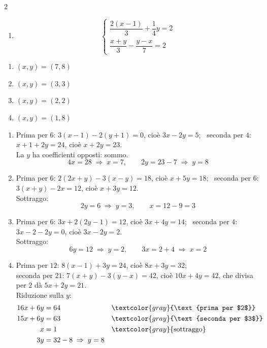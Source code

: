 \begin{question}[ID=2.5, subtitle={Sistemi con frazioni complesse}, difficulty=difficile, tags={sistemi, equazioni lineari, frazioni}]
\begin{multicols}{2}
\begin{enumerate}[leftmargin=3.2cm]
    \item
    \[
    \begin{cases}
    \dfrac{2(x-1)}{3}+\dfrac{1}{4}y=2\\
    \dfrac{x+y}{3}-\dfrac{y-x}{7}=2
    \end{cases}
    \]
\end{enumerate}
\end{multicols}
\begin{solution}
\begin{enumerate}
    \item $(x,y)=(7,8)$
    \item $(x,y)=(3,3)$
    \item $(x,y)=(2,2)$
    \item $(x,y)=(1,8)$
\end{enumerate}
\end{solution}
\begin{explanation}
\begin{enumerate}
    \item Prima per $6$: $3(x-1)-2(y+1)=0$, cioè $3x-2y=5$; \ seconda per $4$: $x+1+2y=24$, cioè $x+2y=23$. \\
    La $y$ ha coefficienti opposti: sommo.
    \[ 4x=28 \;\Rightarrow\; x=7, \qquad 2y=23-7 \;\Rightarrow\; y=8 \]
    \item Prima per $6$: $2(2x+y)-3(x-y)=18$, cioè $x+5y=18$; \ seconda per $6$: $3(x+y)-2x=12$, cioè $x+3y=12$. \\
    Sottraggo:
    \[ 2y=6 \;\Rightarrow\; y=3, \qquad x=12-9=3 \]
    \item Prima per $6$: $3x+2(2y-1)=12$, cioè $3x+4y=14$; \ seconda per $4$: $3x-2-2y=0$, cioè $3x-2y=2$. \\
    Sottraggo:
    \[ 6y=12 \;\Rightarrow\; y=2, \qquad 3x=2+4 \;\Rightarrow\; x=2 \]
    \item Prima per $12$: $8(x-1)+3y=24$, cioè $8x+3y=32$; \\
    seconda per $21$: $7(x+y)-3(y-x)=42$, cioè $10x+4y=42$, che divisa per $2$ dà $5x+2y=21$. \\
    Riduzione sulla $y$:
    \[\begin{aligned}
    16x+6y &= 64 && \textcolor{gray}{\text{prima per $2$}}\\
    15x+6y &= 63 && \textcolor{gray}{\text{seconda per $3$}}\\
    x &= 1 && \textcolor{gray}{\text{sottraggo}}\\
    3y &= 32-8 \;\Rightarrow\; y=8
    \end{aligned}\]
\end{enumerate}
\end{explanation}
\end{question}

